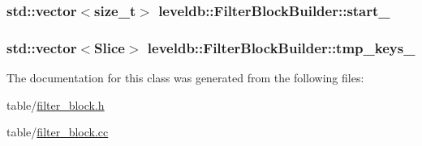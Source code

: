\hypertarget{classleveldb_1_1_filter_block_builder_a17f19fc8365e35a5808c97482f2fea3a}{
\subsubsection[{start\-\_\-}]{\setlength{\rightskip}{0pt plus 5cm}std\-::vector$<$size\-\_\-t$>$ leveldb\-::\-Filter\-Block\-Builder\-::start\-\_\-\hspace{0.3cm}{\ttfamily [private]}}}\label{classleveldb_1_1_filter_block_builder_a17f19fc8365e35a5808c97482f2fea3a}
\hypertarget{classleveldb_1_1_filter_block_builder_a3f111a41d738802bdd2a6c50892718f5}{
\subsubsection[{tmp\-\_\-keys\-\_\-}]{\setlength{\rightskip}{0pt plus 5cm}std\-::vector$<${\bf Slice}$>$ leveldb\-::\-Filter\-Block\-Builder\-::tmp\-\_\-keys\-\_\-\hspace{0.3cm}{\ttfamily [private]}}}\label{classleveldb_1_1_filter_block_builder_a3f111a41d738802bdd2a6c50892718f5}


The documentation for this class was generated from the following files\-:\begin{DoxyCompactItemize}
\item 
table/\hyperlink{filter__block_8h}{filter\-\_\-block.\-h}\item 
table/\hyperlink{filter__block_8cc}{filter\-\_\-block.\-cc}\end{DoxyCompactItemize}
